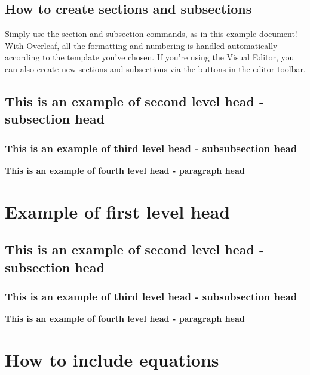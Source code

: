 \documentclass[12pt,a4paper]{article}
\newcommand{\subsubsubsection}[1]{%
  \vspace{\baselineskip}%
  \noindent\textbf{#1\\}\quad%
}
\begin{document}
\lipsum[4]


\subsection{How to create sections and subsections}
Simply use the section and subsection commands, as in this example document! With Overleaf, all the formatting and numbering is handled automatically according to the template you've chosen. If you're using the Visual Editor, you can also create new sections and subsections via the buttons in the editor toolbar.

\subsection{This is an example of second level head - subsection head}\label{subsec1}
\lipsum[5]

\subsubsection{This is an example of third level head - subsubsection head}\label{subsubsec1}
\lipsum[6]

\subsubsubsection{This is an example of fourth level head - paragraph head}
\lipsum[7]


\section{Example of first level head}\label{sec3}

\subsection{This is an example of second level head - subsection head}\label{subsec2}

\subsubsection{This is an example of third level head - subsubsection head}\label{subsubsec2}
\lipsum[8]

\subsubsubsection{This is an example of fourth level head - paragraph head}
\lipsum[9]


\section{How to include equations}\label{sec4}
\end{document}
